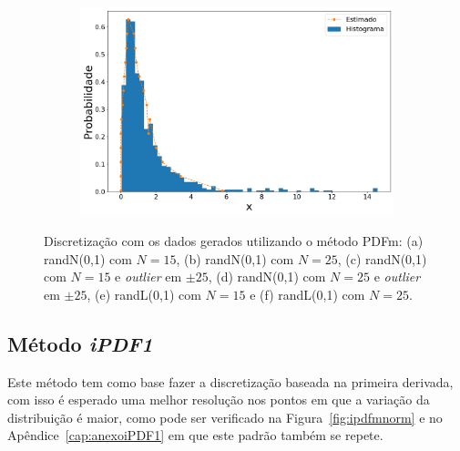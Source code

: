 \begin{figure}[H]
\begin{subfigure}[b]{0.45\textwidth}
		\includegraphics[width=\linewidth]{./figuras/PDFm_lognormal_25_1000_0}
		\caption{}
		\label{fig:pdfm_lognorm25_data}
	\end{subfigure}
	\caption{Discretização com os dados gerados utilizando o método \ac{PDFm}: (a) randN(0,1) com $N = 15$, (b) randN(0,1) com $N = 25$, (c) randN(0,1) com $N = 15$ e \textit{outlier} em $\pm 25$, (d) randN(0,1) com $N = 25$ e \textit{outlier} em $\pm 25$, (e) randL(0,1) com $ N = 15 $ e (f) randL(0,1) com $ N = 25 $.}
	\label{fig:pdfm_data}
\end{figure}

\subsection{Método \textit{iPDF1}}

Este método tem como base fazer a discretização baseada na primeira derivada, com isso é esperado uma melhor resolução nos pontos em que a variação da distribuição é maior, como pode ser verificado na Figura~\ref{fig:ipdfmnorm} e no Apêndice~\ref{cap:anexoiPDF1} em que este padrão também se repete. 

